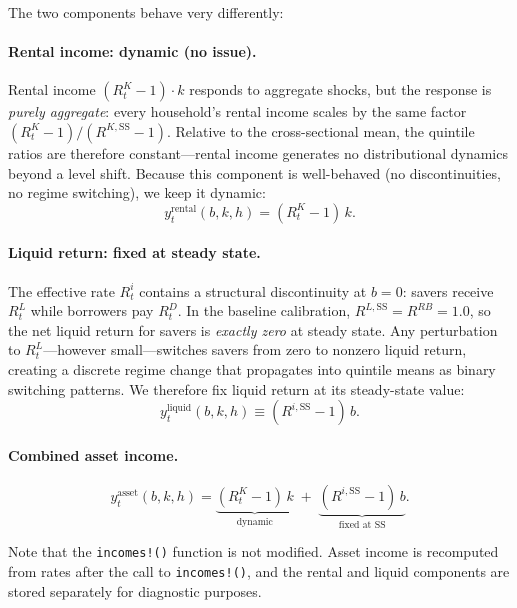 \documentclass[11pt]{article}
\newcommand{\SS}{\mathrm{SS}}
\begin{document}
The two components behave very differently:

\paragraph{Rental income: dynamic (no issue).}
Rental income $(R^K_t - 1) \cdot k$ responds to aggregate shocks, but the
response is \emph{purely aggregate}: every household's rental income scales by
the same factor $(R^K_t - 1) / (R^{K,\SS} - 1)$.  Relative to the
cross-sectional mean, the quintile ratios are therefore constant---rental income
generates no distributional dynamics beyond a level shift.  Because this
component is well-behaved (no discontinuities, no regime switching), we keep it
dynamic:
\begin{equation}
    y^{\text{rental}}_t(b,k,h) = (R^K_t - 1)\, k.
\end{equation}

\paragraph{Liquid return: fixed at steady state.}
The effective rate $R^i_t$ contains a structural discontinuity at $b = 0$:
savers receive $R^L_t$ while borrowers pay $R^D_t$.  In the baseline
calibration, $R^{L,\SS} = R^{RB} = 1.0$, so the net liquid return for savers
is \emph{exactly zero} at steady state.  Any perturbation to $R^L_t$---however
small---switches savers from zero to nonzero liquid return, creating a discrete
regime change that propagates into quintile means as binary switching patterns.
We therefore fix liquid return at its steady-state value:
\begin{equation}
    y^{\text{liquid}}_t(b,k,h) \equiv (R^{i,\SS} - 1)\, b.
\end{equation}

\paragraph{Combined asset income.}
\begin{equation}\label{eq:asset_fix}
    y^{\text{asset}}_t(b,k,h)
        = \underbrace{(R^K_t - 1)\, k}_{\text{dynamic}}
        \;+\; \underbrace{(R^{i,\SS} - 1)\, b}_{\text{fixed at SS}}.
\end{equation}

Note that the \texttt{incomes!()} function is not modified. Asset income is
recomputed from rates after the call to \texttt{incomes!()}, and the
rental and liquid components are stored separately for diagnostic purposes.
\end{document}

